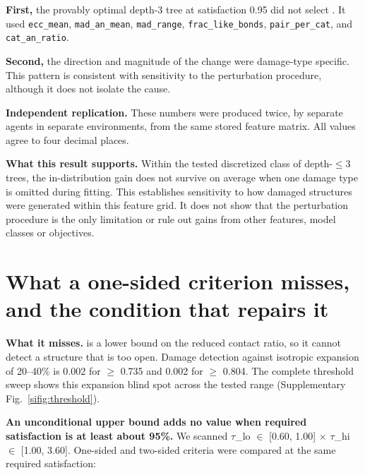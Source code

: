 \textbf{First,} the provably optimal depth-3 tree at satisfaction 0.95 did not
select \rhoc{}. It used \texttt{ecc\_mean}, \texttt{mad\_an\_mean},
\texttt{mad\_range}, \texttt{frac\_like\_bonds}, \texttt{pair\_per\_cat}, and
\texttt{cat\_an\_ratio}.

\textbf{Second,} the direction and magnitude of the change were damage-type specific. This
pattern is consistent with sensitivity to the perturbation procedure, although
it does not isolate the cause.

\textbf{Independent replication.} These numbers were produced twice, by separate agents in
separate environments, from the same stored feature matrix. All values agree to four decimal places.

\textbf{What this result supports.} Within the tested discretized class of depth-$\leq 3$
trees, the in-distribution gain does not survive on average when one damage type is omitted
during fitting. This establishes sensitivity to how damaged structures were generated within
this feature grid. It does not show that the perturbation procedure is the only limitation or
rule out gains from other features, model classes or objectives.

\section{What a one-sided criterion misses, and the condition that repairs it}\label{note:s11}

\textbf{What it misses.} \rhoc{} is a lower bound on the reduced contact ratio, so it cannot detect
a structure that is too open. Damage detection against isotropic expansion
of 20--40\% is 0.002 for \rhoc{} $\geq$ 0.735 and 0.002 for \rhoc{} $\geq$ 0.804.
The complete threshold sweep shows this expansion blind spot across the tested range
(Supplementary Fig.~\ref{sifig:threshold}).

\textbf{An unconditional upper bound adds no value when required satisfaction is at least about 95\%.}
We scanned $\tau$\_lo $\in$ {[}0.60, 1.00{]} $\times$ $\tau$\_hi $\in$
{[}1.00, 3.60{]}. One-sided and two-sided criteria were compared at the same
required satisfaction:

